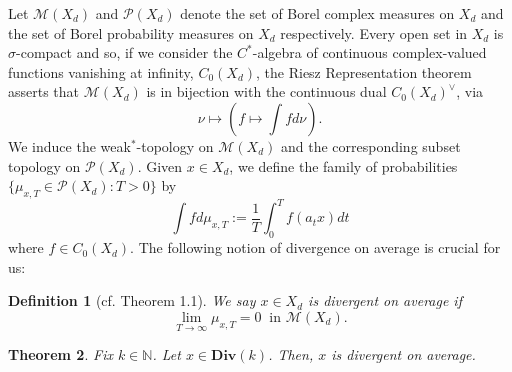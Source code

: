 \documentclass[reqno,11pt]{amsart}
\theoremstyle{plain}
\newtheorem{thm}{Theorem}[section]
\newtheorem{defn}[thm]{Definition}
\theoremstyle{definition}
\theoremstyle{remark}
\numberwithin{equation}{section}
\newcommand{\D}{\mathbf{Div}}
\newcommand{\N}{{\mathbb{N}}}
\begin{document}
Let $\mathcal{M}(X_d)$ and $\mathcal{P}(X_d)$ denote the set of Borel complex measures on $X_d$ and the set of Borel probability measures on $X_d$ respectively. Every open set in $X_d$ is $\sigma$-compact and so, if we consider the $C^*$-algebra of continuous complex-valued functions vanishing at infinity, $C_0(X_d)$, the Riesz Representation theorem \cite[Theorem 6.19]{Ru} asserts that $\mathcal{M}(X_d)$ is in bijection with the continuous dual $C_0(X_d)^{\vee}$, via
\begin{equation}
    \nu \mapsto \left(f\mapsto \int f d\nu\right).
\end{equation}
We induce the weak$^*$-topology on $\mathcal{M}(X_d)$ and the corresponding subset topology on $\mathcal{P}(X_d)$.
Given $x\in X_d$, we define the family of probabilities $\{\mu_{x,T} \in \mathcal{P}(X_d): T>0\}$ by
\begin{equation}\label{mu_T}
    \int f d\mu_{x,T} := \frac{1}{T}\int_0^T f(a_tx) dt
\end{equation}
where $f \in C_0(X_d)$.
The following notion of divergence on average is crucial for us:
\begin{defn}[cf. \cite{KKLM} Theorem 1.1]
    We say $x \in X_d$ is divergent on average if
    \begin{equation*}
        \lim_{T \to \infty} \mu_{x,T} = 0\ \text{ in } \mathcal{M}(X_d).
    \end{equation*}
\end{defn}
\begin{thm}\label{escape}
Fix $k \in \N$. Let $x\in \D(k)$. Then, $x$ is divergent on average.
\end{thm}
\end{document}
